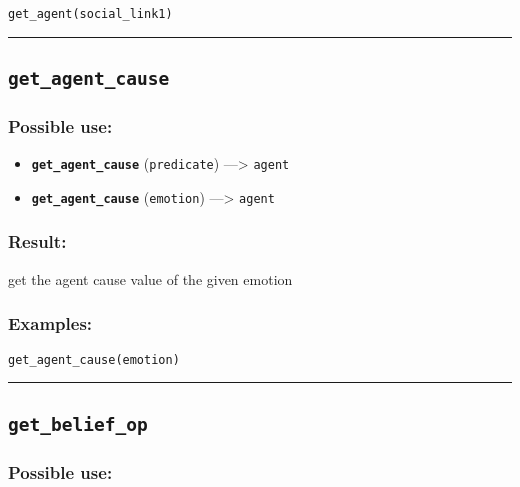\documentclass[]{book}
\providecommand{\tightlist}{%
  \setlength{\itemsep}{0pt}\setlength{\parskip}{0pt}}
\theoremstyle{definition}
\theoremstyle{definition}
\theoremstyle{definition}
\theoremstyle{remark}
\begin{document}
\begin{verbatim}
get_agent(social_link1) 
\end{verbatim}

\begin{center}\rule{0.5\linewidth}{\linethickness}\end{center}

\subsection{\texorpdfstring{\texttt{get\_agent\_cause}}{get\_agent\_cause}}\label{get_agent_cause}

\subsubsection{Possible use:}\label{possible-use-196}

\begin{itemize}
\tightlist
\item
  \textbf{\texttt{get\_agent\_cause}} (\texttt{predicate})
  ---\textgreater{} \texttt{agent}
\item
  \textbf{\texttt{get\_agent\_cause}} (\texttt{emotion})
  ---\textgreater{} \texttt{agent}
\end{itemize}

\subsubsection{Result:}\label{result-190}

get the agent cause value of the given emotion

\subsubsection{Examples:}\label{examples-143}

\begin{verbatim}
get_agent_cause(emotion) 
\end{verbatim}

\begin{center}\rule{0.5\linewidth}{\linethickness}\end{center}

\subsection{\texorpdfstring{\texttt{get\_belief\_op}}{get\_belief\_op}}\label{get_belief_op}

\subsubsection{Possible use:}\label{possible-use-197}
\end{document}
